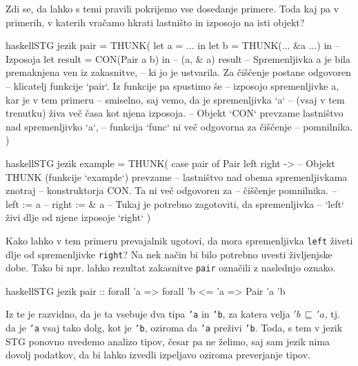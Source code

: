 Zdi se, da lahko s temi pravili pokrijemo vse dosedanje primere. Toda kaj pa v primerih, v katerih vračamo hkrati lastništo in izposojo na isti objekt?

\begin{code-box}{haskell}{STG jezik}
pair = THUNK(
    let a = ... in
    let b = THUNK(... &a ...) in -- Izposoja
    let result = CON(Pair a b) in -- (a, & a)
        result
        -- Spremenljivka a je bila premaknjena ven iz zakasnitve,
        -- ki jo je ustvarila. Za čiščenje postane odgovoren
        -- klicatelj funkcije `pair`. Iz funkcije pa spustimo še
        -- izposojo spremenljivke a, kar je v tem primeru
        -- smiselno, saj vemo, da je spremenljivka `a`
        -- (vsaj v tem trenutku) živa več časa kot njena izposoja.
        -- Objekt `CON` prevzame lastništvo nad spremenljivko `a`,
        -- funkcija `func` ni več odgovorna za čiščenje
        -- pomnilnika.
)
\end{code-box}

\begin{code-box}{haskell}{STG jezik}
example = THUNK(
    case pair of {
        Pair left right ->
            -- Objekt THUNK (funkcije `example`) prevzame
            -- lastništvo nad obema spremenljivkama znotraj
            -- konstruktorja CON. Ta ni več odgovoren za
            -- čiščenje pomnilnika.
            --   left  := a
            --   right := & a
            -- Tukaj je potrebno zagotoviti, da spremenljivka
            -- `left` živi dlje od njene izposoje `right`
    }
)
\end{code-box}

Kako lahko v tem primeru prevajalnik ugotovi, da mora spremenljivka \texttt{left} živeti dlje od spremenljivke \texttt{right}? Na nek način bi bilo potrebno uvesti življenjske dobe. Tako bi npr. lahko rezultat zakasnitve \texttt{pair} označili z naslednjo oznako.

\begin{code-box}{haskell}{STG jezik}
pair :: forall 'a => forall 'b <= 'a => Pair 'a 'b
\end{code-box}

Iz te je razvidno, da je ta vsebuje dva tipa \texttt{'a} in \texttt{'b}, za katera velja $'b \, \sqsubseteq \, 'a$, tj. da je \texttt{'a} vsaj tako dolg, kot je \texttt{'b}, oziroma da \texttt{'a} preživi \texttt{'b}. Toda, s tem v jezik STG ponovno uvedemo analizo tipov, česar pa ne želimo, saj sam jezik nima dovolj podatkov, da bi lahko izvedli izpeljavo oziroma preverjanje tipov.

